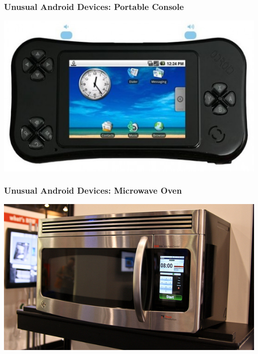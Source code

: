 \begin{frame}
  \frametitle{Unusual Android Devices: Portable Console}
  \begin{center}
    \includegraphics[width=\textwidth,height=0.7\textheight,keepaspectratio]{slides/android-introduction-hardware/odroid.jpg}
  \end{center}
\end{frame}

\begin{frame}
  \frametitle{Unusual Android Devices: Microwave Oven}
  \begin{center}
    \includegraphics[width=\textwidth,height=0.7\textheight,keepaspectratio]{slides/android-introduction-hardware/maid-oven.jpg}
  \end{center}
\end{frame}

